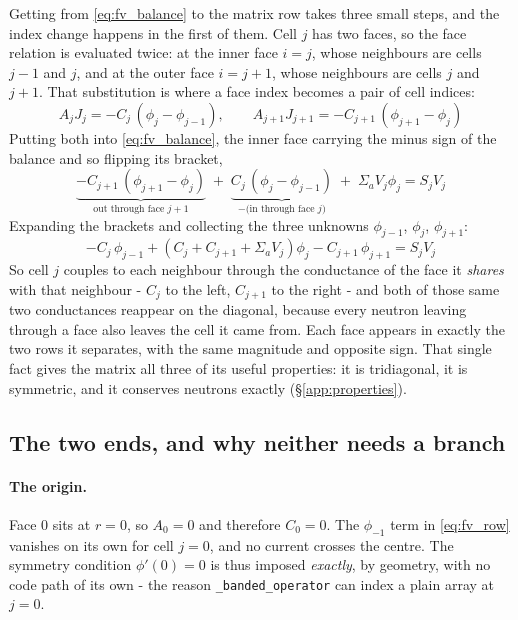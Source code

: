 \documentclass[11pt]{article}
\begin{document}
{Getting from \eqref{eq:fv_balance} to the matrix row takes three small steps, and the index change happens in the first of them. Cell $j$ has two faces, so the face relation is evaluated twice: at the inner face $i = j$, whose neighbours are cells $j-1$ and $j$, and at the outer face $i = j+1$, whose neighbours are cells $j$ and $j+1$. That substitution is where a face index becomes a pair of cell indices:
\begin{equation}
    A_j J_j = -C_j\,(\phi_j - \phi_{j-1}),
    \qquad
    A_{j+1} J_{j+1} = -C_{j+1}\,(\phi_{j+1} - \phi_j)
\end{equation}
Putting both into \eqref{eq:fv_balance}, the inner face carrying the minus sign of the balance and so flipping its bracket,
\begin{equation}
    \underbrace{-C_{j+1}\,(\phi_{j+1} - \phi_j)}_{\text{out through face } j+1}
    \;+\; \underbrace{C_j\,(\phi_j - \phi_{j-1})}_{\text{$-$(in through face } j)}
    \;+\; \Sigma_a V_j \phi_j = S_j V_j
\end{equation}
Expanding the brackets and collecting the three unknowns $\phi_{j-1}$, $\phi_j$, $\phi_{j+1}$:
\begin{equation}
    -C_j\,\phi_{j-1}
    + \left(C_j + C_{j+1} + \Sigma_a V_j\right)\phi_j
    - C_{j+1}\,\phi_{j+1}
    = S_j V_j
    \label{eq:fv_row}
\end{equation}
So cell $j$ couples to each neighbour through the conductance of the face it \emph{shares} with that neighbour - $C_j$ to the left, $C_{j+1}$ to the right - and both of those same two conductances reappear on the diagonal, because every neutron leaving through a face also leaves the cell it came from.
Each face appears in exactly the two rows it separates, with the same magnitude and opposite sign. That single fact gives the matrix all three of its useful properties: it is tridiagonal, it is symmetric, and it conserves neutrons exactly (\S\ref{app:properties}).

\subsection*{The two ends, and why neither needs a branch}

\paragraph{The origin.} Face $0$ sits at $r = 0$, so $A_0 = 0$ and therefore $C_0 = 0$. The $\phi_{-1}$ term in \eqref{eq:fv_row} vanishes on its own for cell $j = 0$, and no current crosses the centre. The symmetry condition $\phi'(0) = 0$ is thus imposed \emph{exactly}, by geometry, with no code path of its own - the reason \texttt{\_banded\_operator} can index a plain array at $j = 0$.

}
\end{document}
